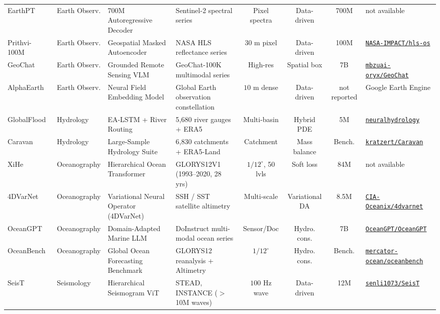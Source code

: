 \begin{table}[t]
{\begin{tabular}{@{}lp{2.0cm}p{3.0cm}p{3.4cm}cccp{3.0cm}@{}}
EarthPT~\cite{smith2023earthpt} & Earth Observ. & 700M Autoregressive Decoder & Sentinel-2 spectral series & Pixel spectra & Data-driven & 700M & not available \\
Prithvi-100M~\cite{jakubik2023prithvi} & Earth Observ. & Geospatial Masked Autoencoder & NASA HLS reflectance series & $30\text{ m}$ pixel & Data-driven & 100M & \href{https://github.com/NASA-IMPACT/hls-foundation-os}{\texttt{NASA-IMPACT/hls-os}} \\
GeoChat~\cite{kuckreja2024geochat} & Earth Observ. & Grounded Remote Sensing VLM & GeoChat-100K multimodal series & High-res & Spatial box & 7B & \href{https://github.com/mbzuai-oryx/GeoChat}{\texttt{mbzuai-oryx/GeoChat}} \\
AlphaEarth~\cite{brown2025alphaearth} & Earth Observ. & Neural Field Embedding Model & Global Earth observation constellation & $10\text{ m}$ dense & Data-driven & not reported & Google Earth Engine \\
GlobalFlood~\cite{nearing2024globalflood} & Hydrology & EA-LSTM + River Routing & 5,680 river gauges + ERA5 & Multi-basin & Hybrid PDE & 5M & \href{https://github.com/neuralhydrology/neuralhydrology}{\texttt{neuralhydrology}} \\
Caravan~\cite{kratzert2023caravan} & Hydrology & Large-Sample Hydrology Suite & 6,830 catchments + ERA5-Land & Catchment & Mass balance & Bench. & \href{https://github.com/kratzert/Caravan}{\texttt{kratzert/Caravan}} \\
XiHe~\cite{wang2024xihe} & Oceanography & Hierarchical Ocean Transformer & GLORYS12V1 (1993--2020, 28 yrs) & $1/12^\circ$, 50 lvls & Soft loss & 84M & not available \\
4DVarNet~\cite{fablet2021learning} & Oceanography & Variational Neural Operator (4DVarNet) & SSH / SST satellite altimetry & Multi-scale & Variational DA & 8.5M & \href{https://github.com/CIA-Oceanix/4dvarnet-core}{\texttt{CIA-Oceanix/4dvarnet}} \\
OceanGPT~\cite{bi2024oceangpt} & Oceanography & Domain-Adapted Marine LLM & DoInstruct multi-modal ocean series & Sensor/Doc & Hydro. cons. & 7B & \href{https://github.com/OceanGPT/OceanGPT}{\texttt{OceanGPT/OceanGPT}} \\
OceanBench~\cite{elaouni2025oceanbench} & Oceanography & Global Ocean Forecasting Benchmark & GLORYS12 reanalysis + Altimetry & $1/12^\circ$ & Hydro. cons. & Bench. & \href{https://github.com/mercator-ocean/oceanbench}{\texttt{mercator-ocean/oceanbench}} \\
SeisT~\cite{li2024seist} & Seismology & Hierarchical Seismogram ViT & STEAD, INSTANCE ($>$10M waves) & $100\text{ Hz}$ wave & Data-driven & 12M & \href{https://github.com/senli1073/SeisT}{\texttt{senli1073/SeisT}} \\

\end{tabular}}
\end{table}
